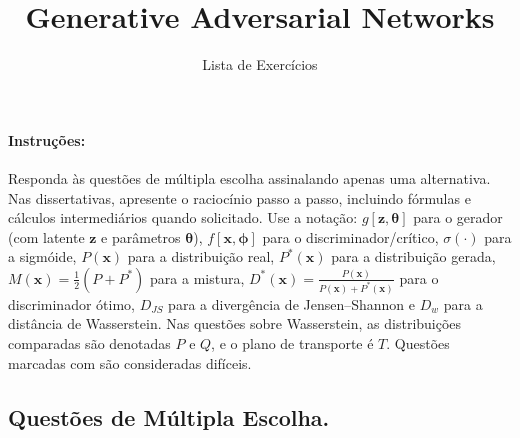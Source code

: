 \documentclass{dlproblemset}
\title{Generative Adversarial Networks}
\subtitle{Lista de Exercícios}
\newcommand{\thetav}{\boldsymbol{\theta}}
\begin{document}
\paragraph{Instruções:} Responda às questões de múltipla escolha assinalando apenas uma alternativa. Nas dissertativas, apresente o raciocínio passo a passo, incluindo fórmulas e cálculos intermediários quando solicitado. Use a notação: $g[\mathbf{z},\thetav]$ para o gerador (com latente $\mathbf{z}$ e parâmetros $\thetav$), $f[\mathbf{x},\boldsymbol{\phi}]$ para o discriminador/crítico, $\sigma(\cdot)$ para a sigmóide, $P(\mathbf{x})$ para a distribuição real, $P^{*}(\mathbf{x})$ para a distribuição gerada, $M(\mathbf{x}) = \tfrac{1}{2}(P+P^{*})$ para a mistura, $D^{*}(\mathbf{x}) = \tfrac{P(\mathbf{x})}{P(\mathbf{x})+P^{*}(\mathbf{x})}$ para o discriminador ótimo, $D_{JS}$ para a divergência de Jensen--Shannon e $D_{w}$ para a distância de Wasserstein. Nas questões sobre Wasserstein, as distribuições comparadas são denotadas $P$ e $Q$, e o plano de transporte é $T$. Questões marcadas com  são consideradas difíceis.

\subsection*{Questões de Múltipla Escolha.}
\end{document}
